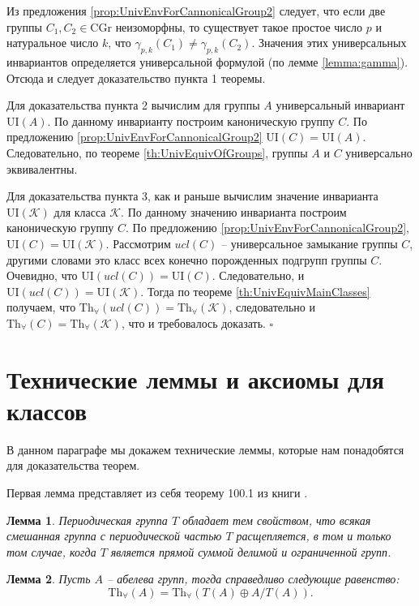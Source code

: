 \documentclass[a4paper,11pt,twoside]{article}
\newtheorem{lemma}{Лемма}[section]
\def\proof{{\noindent{\bf Доказательство.}} }
\def\K{{\mathcal{K}}}
\def\Tha{{\mathrm{Th}_\forall}}
\def\CG{{\mathrm{CGr}}}
\def\ui{{\mathrm{UI}}}
\begin{document}
\proof Из предложения \ref{prop:UnivEnvForCannonicalGroup2} следует, что если две группы $C_1, C_2 \in \CG$ неизоморфны, то существует такое простое число $p$ и натуральное число $k$, что $\gamma_{p,k}(C_1) \neq \gamma_{p,k}(C_2)$. Значения этих универсальных инвариантов определяется универсальной формулой (по лемме \ref{lemma:gamma}). Отсюда и следует доказательство пункта 1 теоремы.

Для доказательства пункта 2 вычислим для группы $A$ универсальный инвариант $\ui(A)$. По данному инварианту построим каноническую группу $C$. По предложению \ref{prop:UnivEnvForCannonicalGroup2} $\ui(C) = \ui(A)$. Следовательно, по теореме \ref{th:UnivEquivOfGroups}, группы $A$ и $C$ универсально эквивалентны.

Для доказательства пункта 3, как и раньше вычислим значение инварианта $\ui(\K)$ для класса $\K$. По данному значению инварианта построим каноническую группу $C$. По предложению \ref{prop:UnivEnvForCannonicalGroup2}, $\ui(C) = \ui(\K).$ Рассмотрим $ucl(C)$ -- универсальное замыкание группы $C$, другими словами это класс всех конечно порожденных подгрупп группы $C$. Очевидно, что $\ui(ucl(C)) = \ui(C)$. Следовательно, и $\ui(ucl(C)) = \ui(\K)$. Тогда по теореме \ref{th:UnivEquivMainClasses} получаем, что $\Tha(ucl(C)) = \Tha(\K)$, следовательно и $\Tha(C) = \Tha(\K)$, что и требовалось доказать. $\square$






\section{Технические леммы и аксиомы для классов}\label{sec:lemmas}

В данном параграфе мы докажем технические леммы, которые нам понадобятся для доказательства теорем. 

Первая лемма представляет из себя теорему 100.1 из книги \cite{Fuchs2}.

\begin{lemma}\label{lemma:Fuchs}
Периодическая группа $T$ обладает тем свойством, что всякая смешанная группа с периодической частью $T$ расщепляется, в том и только том случае, когда $T$ является прямой суммой делимой и ограниченной групп.
\end{lemma}

\begin{lemma}\label{lemma:UnivEquivATA}
Пусть $A$ -- абелева групп, тогда справедливо следующие равенство:
$$\Tha(A) = \Tha(T(A) \oplus A \big/ T(A)).$$
\end{lemma}
\end{document}

